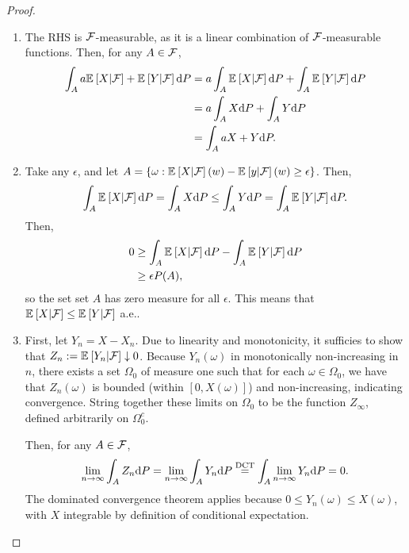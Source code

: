 \begin{proof}
    \begin{enumerate}
        \item The RHS is $\mathcal{F}$-measurable, as it is a linear combination of $\mathcal{F}$-measurable functions. Then, for any $A \in \mathcal{F}$,
        \begin{align*}
            \int_A a{\mathbb E}_{}\left[X | \mathcal{F}\right] + {\mathbb E}_{}\left[Y | \mathcal{F}\right] \text{d} P &= a \int_A {\mathbb E}_{}\left[X | \mathcal{F}\right] \text{d} P +  \int_A {\mathbb E}_{}\left[Y | \mathcal{F}\right] \text{d} P\\
            &= a \int_A X \text{d} P +  \int_A Y \text{d} P\\
            &= \int_A aX + Y \text{d} P.
        \end{align*}
        \item Take any $\epsilon$, and let $A = \{\omega: {\mathbb E}_{}\left[X | \mathcal{F}\right](w) - {\mathbb E}_{}\left[y | \mathcal{F}\right](w) \geq \epsilon\}$. Then,
        \begin{align*}
            \int_A {\mathbb E}_{}\left[X | \mathcal{F}\right] \text{d} P = \int_A X \text{d} P \leq \int_A Y \text{d} P = \int_A {\mathbb E}_{}\left[Y | \mathcal{F}\right] \text{d} P.
        \end{align*}
        Then,
        \begin{align*}
            0 &\geq \int_A {\mathbb E}_{}\left[X | \mathcal{F}\right] \text{d} P -  \int_A {\mathbb E}_{}\left[Y | \mathcal{F}\right] \text{d} P\\
            &\geq \epsilon P(A),
        \end{align*}
        so the set set $A$ has zero measure for all $\epsilon$. This means that ${\mathbb E}_{}\left[X | \mathcal{F}\right] \leq {\mathbb E}_{}\left[Y | \mathcal{F}\right]$ a.e..
        \item First, let $Y_n = X - X_n$. Due to linearity and monotonicity, it sufficies to show that $Z_n := {\mathbb E}_{}\left[Y_n | \mathcal{F}\right] \downarrow 0$. Because $Y_n(\omega)$ in monotonically non-increasing in $n$, there exists a set $\Omega_0$ of measure one such that for each $\omega \in \Omega_0$, we have that $Z_n(\omega)$ is bounded (within $[0, X(\omega)]$) and non-increasing, indicating convergence. String together these limits on $\Omega_0$ to be the function $Z_\infty$, defined arbitrarily on $\Omega_0^c$.

        Then, for any $A \in \mathcal{F}$,
        \begin{align*}
            \lim_{n \rightarrow \infty} \int_A Z_n \text{d} P = \lim_{n \rightarrow \infty} \int_A Y_n \text{d} P \overset{\text{DCT}}{=} \int_A \lim_{n \rightarrow \infty} Y_n \text{d} P = 0.
        \end{align*}
        The dominated convergence theorem applies because $0 \leq Y_n(\omega) \leq X(\omega)$, with $X$ integrable by definition of conditional expectation.
    \end{enumerate}
\end{proof}

